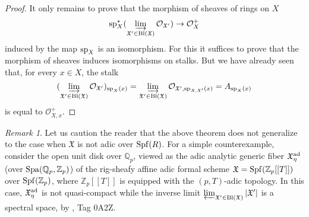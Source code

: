 \documentclass[12pt,twoside,a4paper]{article}
\theoremstyle{definition}
\theoremstyle{remark}
\newtheorem{rmk}[thm]{Remark}
\newcommand\ad{{\rm ad}}
\newcommand\Bl{{\rm Bl}}
\newcommand\spc{{\rm sp}}
\newcommand\Spa{{\rm Spa}}
\newcommand\Spf{{\rm Spf}}
\begin{document}
\begin{proof}
It only remains to prove that the morphism of sheaves of rings on $X$\begin{equation*}\spc_{X}^{\ast}(\varinjlim_{\mathfrak{X}'\in\Bl(\mathfrak{X})}\mathcal{O}_{\mathfrak{X}'})\to \mathcal{O}_{X}^{+}\end{equation*}induced by the map $\spc_{X}$ is an isomorphism. For this it suffices to prove that the morphism of sheaves induces isomorphisms on stalks. But we have already seen that, for every $x\in X$, the stalk\begin{equation*}(\varinjlim_{\mathfrak{X}'\in\Bl(\mathfrak{X})}\mathcal{O}_{\mathfrak{X}'})_{\spc_{X}(x)}=\varinjlim_{\mathfrak{X}'\in\Bl(\mathfrak{X})}\mathcal{O}_{\mathfrak{X}',\spc_{X,\mathfrak{X}'}(x)}=A_{\spc_{X}(x)}\end{equation*}is equal to $\mathcal{O}_{X,x}^{+}$.\end{proof}
\begin{rmk}\label{Generic fiber in the non-adic case}Let us caution the reader that the above theorem does not generalize to the case when $\mathfrak{X}$ is not adic over $\Spf(R)$. For a simple counterexample, consider the open unit disk over $\mathbb{Q}_{p}$, viewed as the adic analytic generic fiber $\mathfrak{X}_{\eta}^{\ad}$ (over $\Spa(\mathbb{Q}_{p}, \mathbb{Z}_{p})$) of the rig-sheafy affine adic formal scheme $\mathfrak{X}=\Spf(\mathbb{Z}_{p}[[T]])$ over $\Spf(\mathbb{Z}_{p})$, where $\mathbb{Z}_{p}[[T]]$ is equipped with the $(p, T)$-adic topology. In this case, $\mathfrak{X}_{\eta}^{\ad}$ is not quasi-compact while the inverse limit $\varprojlim_{\mathfrak{X}'\in\Bl(\mathfrak{X})}\vert\mathfrak{X}'\vert$ is a spectral space, by \cite{Stacks}, Tag 0A2Z.\end{rmk}
\end{document}
